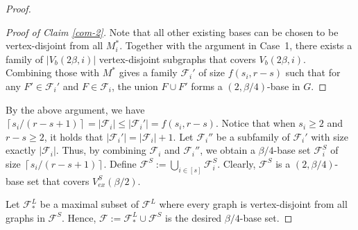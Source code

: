 \documentclass[11pt, a4paper]{article}
\theoremstyle{definition}
\newcommand{\<}{\subseteq}
\begin{document}
\begin{proof}
\begin{proof}[Proof of Claim \ref{com-2}]
Note that all other existing bases can be chosen to be vertex-disjoint from all $M_i^*$.  Together with the argument in Case~1, there exists a family of $|V_b(2\beta, i)|$ vertex-disjoint subgraphs that covers $V_b(2\beta, i)$. Combining those with $M^*$ gives a family $\mathcal{F}_i'$ of size $f(s_i,r-s)$ such that for any $F'\in \mathcal{F}_i'$ and   $F\in\mathcal{F}_i$, the union $F\cup F'$ forms a $(2,\beta/4)$-base in $G$.
\end{proof}



By the above argument, we have 
$\left \lceil s_i/(r-s+1)\right\rceil =|\mathcal{F}_i|\le |\mathcal{F}_i'|=f(s_i,r-s).$ Notice that when $s_i\ge 2$ and $r-s\ge 2$, it holds that $|\mathcal{F}_i'|=|\mathcal{F}_i|+1$. Let $\mathcal{F}_i''$ be a subfamily of $\mathcal{F}_i'$ with size exactly $|\mathcal{F}_i|$. 
Thus, by combining  $\mathcal{F}_i$ and $\mathcal{F}_i''$, we obtain a  $\beta/4$-base set $\mathcal{F}_i^S$ of size $\left \lceil s_i/(r-s+1)\right\rceil$. %
Define $\mathcal{F}^S:=\bigcup_{i\in [s]}\mathcal{F}^S_i$. Clearly,  $\mathcal{F}^S$ is a $(2, \beta/4)$-base set that covers  $V_{ex}^S(\beta/2)$. %

Let $\mathcal{F}^L_*$ be a maximal subset of $\mathcal{F}^L$ where every graph is vertex-disjoint from all graphs in $\mathcal{F}^S$.  
Hence, $\mathcal{F}:=\mathcal{F}^L_*\cup \mathcal{F}^S$ is the desired $\beta/4$-base set. 
\end{proof}
\end{document}
